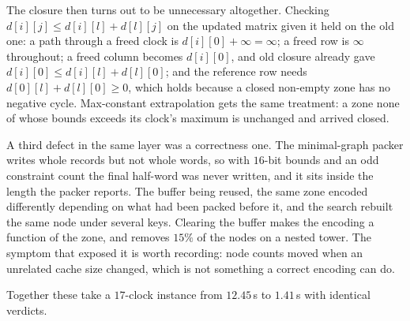 The closure then turns out to be unnecessary altogether. Checking
$d[i][j]\le d[i][l]+d[l][j]$ on the updated matrix given it held on the old one:
a path through a freed clock is $d[i][0]+\infty=\infty$; a freed row is $\infty$
throughout; a freed column becomes $d[i][0]$, and old closure already gave
$d[i][0]\le d[i][l]+d[l][0]$; and the reference row needs
$d[0][l]+d[l][0]\ge 0$, which holds because a closed non-empty zone has no
negative cycle. Max-constant extrapolation gets the same treatment: a zone none
of whose bounds exceeds its clock's maximum is unchanged and arrived closed.

A third defect in the same layer was a correctness one. The minimal-graph packer
writes whole records but not whole words, so with $16$-bit bounds and an odd
constraint count the final half-word was never written, and it sits inside the
length the packer reports. The buffer being reused, the same zone encoded
differently depending on what had been packed before it, and the search rebuilt
the same node under several keys. Clearing the buffer makes the encoding a
function of the zone, and removes $15\%$ of the nodes on a nested tower. The
symptom that exposed it is worth recording: node counts moved when an unrelated
cache size changed, which is not something a correct encoding can do.

Together these take a $17$-clock instance from $12.45$\,s to $1.41$\,s with
identical verdicts.
